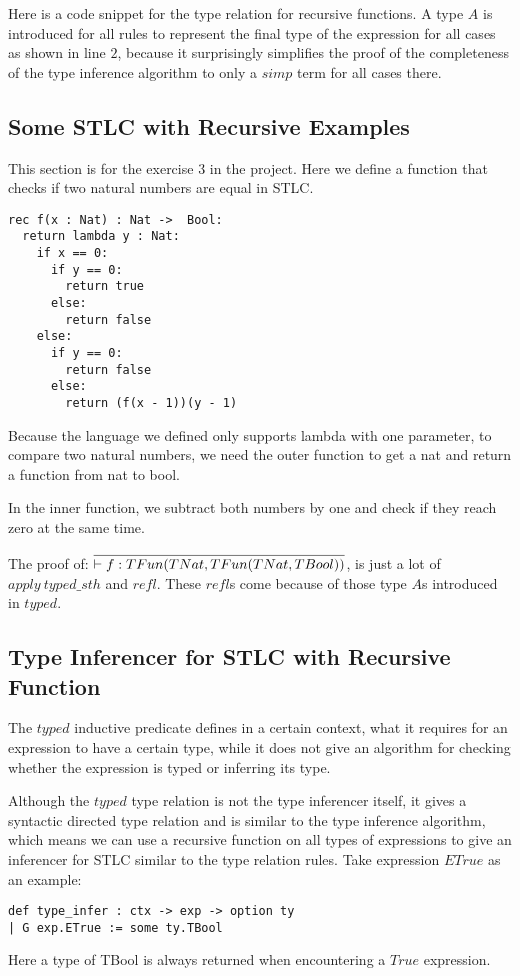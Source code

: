 \documentclass[conference]{IEEEtran}
\begin{document}
Here is a code snippet for the type relation for recursive functions.
A type $A$ is introduced for all rules to represent the final type of
the expression for all cases as shown in line $2$,
because it surprisingly simplifies the
proof of the completeness of the type inference algorithm to only a $simp$
term for all cases there.

\subsection{Some STLC with Recursive Examples}
This section is for the exercise $3$ in the project.
Here we define a function that checks if two natural numbers are equal in STLC.

\begin{lstlisting}
rec f(x : Nat) : Nat ->  Bool:
  return lambda y : Nat:
    if x == 0:
      if y == 0:
        return true
      else:
        return false
    else:
      if y == 0:
        return false
      else:
        return (f(x - 1))(y - 1)
\end{lstlisting}
Because the language we defined only supports lambda with one parameter,
to compare two natural numbers, we need the outer function to get a nat
and return a function from nat to bool.

In the inner function, we subtract both numbers by one and check if they
reach zero at the same time.

The proof of: $\infer{\vdash f:TFun(TNat, TFun(TNat,TBool))}{}$, is just
a lot of $apply\ typed\_sth$ and $refl$. These $refl$s come because of
those type $A$s introduced in $typed$.

\subsection{Type Inferencer for STLC with Recursive Function}
The $typed$ inductive predicate defines in a certain context,
what it requires for an expression to have a certain type, while it does not give
an algorithm for checking whether the expression is typed or inferring its type.

Although the $typed$ type relation is not the type inferencer itself,
it gives a syntactic directed type relation and
is similar to the type inference algorithm,
which means we can use a recursive function on all types of expressions
to give an inferencer for STLC similar to the type relation rules.
Take expression $ETrue$ as an example:

\begin{lstlisting}
def type_infer : ctx -> exp -> option ty
| G exp.ETrue := some ty.TBool
\end{lstlisting}
Here a type of TBool is always returned when encountering a $True$
expression.
\end{document}
